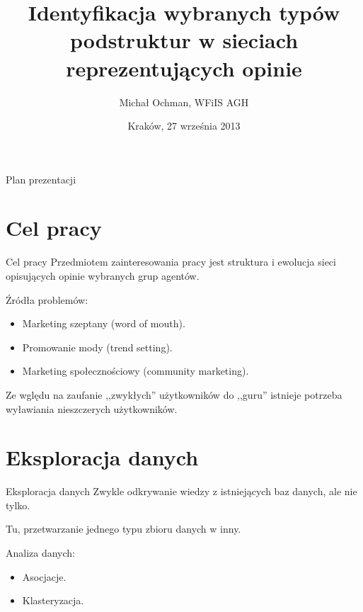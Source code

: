 \documentclass{beamer}
\title[Krótki Tytuł] %
{\LARGE Identyfikacja wybranych typów podstruktur w sieciach reprezentujących opinie}
\author[Michał Ochman] %
{Michał Ochman, WFiIS AGH}
\institute[AGH] %
{
  opiekun: dr hab. Jarosław Kwapień, IFJ PAN
}
\date[27 września 2013] %
{Kraków, 27 września 2013}
\begin{document}
\begin{frame}
  \titlepage
\end{frame}

\begin{frame}{Plan prezentacji}
  \tableofcontents
\end{frame}

\section{Cel pracy}
\begin{frame}{Cel pracy}
  Przedmiotem zainteresowania pracy jest struktura i ewolucja sieci opisujących opinie wybranych grup agentów.
  \pause
  \begin{block}{Źródła problemów:}
    \begin{itemize}
      \item Marketing szeptany (word of mouth).
      \item Promowanie mody (trend setting).
      \item Marketing społecznościowy (community marketing).
    \end{itemize}
  \end{block}
  \pause
  Ze wględu na zaufanie ,,zwykłych'' użytkowników do ,,guru'' istnieje potrzeba wyławiania nieszczerych użytkowników.
\end{frame}

\section{Eksploracja danych}
\begin{frame}{Eksploracja danych}
  Zwykle odkrywanie wiedzy z istniejących baz danych, ale nie tylko.

  Tu, przetwarzanie jednego typu zbioru danych w inny.
  \pause
  \begin{block}{Analiza danych:}
    \begin{itemize}
      \item Asocjacje.
      \item Klasteryzacja.
    \end{itemize}
  \end{block}
\end{frame}
\end{document}
